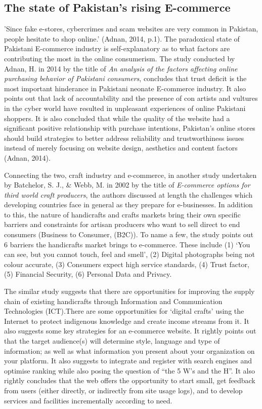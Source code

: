 \subsection{The state of Pakistan's rising E-commerce}

'Since fake e-stores, cybercrimes and scam websites are very common in Pakistan, people hesitate to shop online.' (Adnan,  2014, p.1). The paradoxical state of Pakistani E-commerce industry is self-explanatory as to what factors are contributing the most in the online consumerism. The study conducted by Adnan, H. in 2014 by the title of \textit {An analysis of the factors affecting online purchasing behavior of Pakistani consumers}, concludes that trust deficit is the most important hinderance in Pakistani neonate E-commerce industry. It also points out that lack of accountability and the presence of con artists and vultures in the cyber world have resulted in unpleasant experiences of online Pakistani shoppers. It is also concluded that while the quality of the website had a significant positive relationship with purchase intentions, Pakistan’s online stores should build strategies to better address reliability and trustworthiness issues instead of merely focusing on website design, aesthetics and content factors (Adnan, 2014).

Connecting the two, craft industry and e-commerce, in another study undertaken by Batchelor, S. J., \& Webb, M. in 2002 by the title of \textit {E-commerce options for third world craft producers}, the authors discussed at length the challenges which developing countries face in general as they prepare for e-businesses. In addition to this, the nature of handicrafts and crafts markets bring their own specific barriers and constraints for artisan producers who want to sell direct to end consumers (Business to Consumer, (B2C)). To name a few, the study points out 6 barriers the handicrafts market brings to e-commerce. These include (1) ‘You can see, but you cannot touch, feel and smell’, (2) Digital photographs being not colour accurate, (3) Consumers expect high service standards, (4) Trust factor, (5) Financial Security, (6) Personal Data and Privacy.

The similar study suggests that there are opportunities for improving the supply chain of existing handicrafts through Information and Communication Technologies (ICT).There are some opportunities for ‘digital crafts’ using the Internet to protect indigenous knowledge and create income streams from it. It also suggests some key strategies for an e-commerce website. It rightly points out that the target audience(s) will determine style, language and type of information; as well as what information you present about your organization on your platform. It also suggests to integrate and register with search engines and optimise ranking while also posing the question of “the 5 W's and the H”. It also rightly concludes that the web offers the opportunity to start small, get feedback from users (either directly, or indirectly from site usage logs), and to develop services and facilities incrementally according to need.

